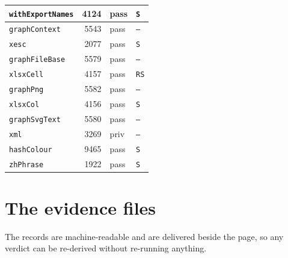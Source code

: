 {\begin{xltabular}{\linewidth}{|l|r|X|X|}
\texttt{withExportNames} & 4124 & pass & \texttt{S} \\ \hline
\texttt{graphContext} & 5543 & pass & \texttt{--} \\ \hline
\texttt{xesc} & 2077 & pass & \texttt{S} \\ \hline
\texttt{graphFileBase} & 5579 & pass & \texttt{--} \\ \hline
\texttt{xlsxCell} & 4157 & pass & \texttt{RS} \\ \hline
\texttt{graphPng} & 5582 & pass & \texttt{--} \\ \hline
\texttt{xlsxCol} & 4156 & pass & \texttt{S} \\ \hline
\texttt{graphSvgText} & 5580 & pass & \texttt{--} \\ \hline
\texttt{xml} & 3269 & priv & \texttt{--} \\ \hline
\texttt{hashColour} & 9465 & pass & \texttt{S} \\ \hline
\texttt{zhPhrase} & 1922 & pass & \texttt{S} \\ \hline
\end{xltabular}}


\section{The evidence files}
The records are machine-readable and are delivered beside the page, so any verdict
can be re-derived without re-running anything.

